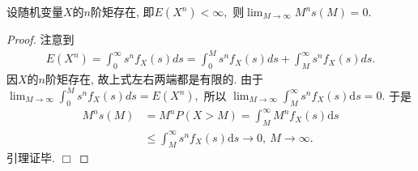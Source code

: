 \documentclass[a4paper,10pt]{ctexbook}
\def\qed{\hfill$\Box$\medskip}
\def\rto{\rightarrow\infty}
\def\no{\nonumber}
\begin{document}
\begin{lemma}\label{lemm0}
    设随机变量$X$的$n$阶矩存在, 即$E(X^n) < \infty,$ 则$\lim_{M \rightarrow \infty}M^ns(M) = 0.$
\end{lemma}
\begin{proof} 注意到
    \begin{align}
        E(X^n)=\int_{0}^\infty s^n f_X(s)ds=\int_0^Ms^n f_X(s)ds +\int_{M}^\infty s^n f_X(s)ds.
    \end{align}
    因$X$的$n$阶矩存在, 故上式左右两端都是有限的. 由于 $\lim_{M\rto} \int_0^Ms^n f_X(s)ds=E(X^n),$ 所以
    $\lim_{M\rto}\int_{M}^{\infty} s^nf_X(s)\mathrm{d}s=0.$ 于是
    \begin{align}
        M^n s(M) & = M^nP(X>M)
        =    \int_{M}^{\infty} M^nf_X(s)\mathrm{d}s  \no                                 \\
                 & \leq \int_{M}^{\infty} s^nf_X(s)\mathrm{d}s \rightarrow 0,\ M\rto.\no
    \end{align}
    引理证毕. \qed
\end{proof}
\end{document}
